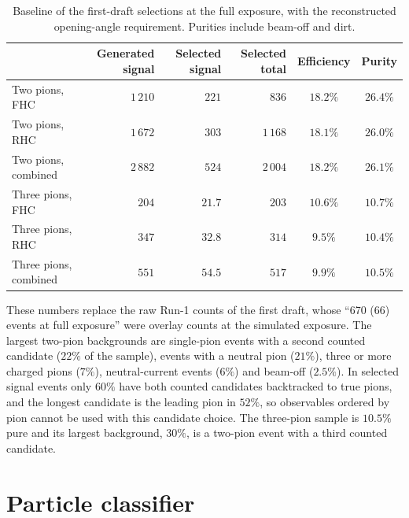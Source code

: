 \documentclass[11pt,a4paper]{article}
\begin{document}
\begin{table}[H]
  \centering
  \caption{Baseline of the first-draft selections at the full exposure, with the reconstructed
    opening-angle requirement. Purities include beam-off and dirt.}
  \label{tab:baseline}
  \small
  \begin{tabular}{lrrrcc}
    \toprule
    & Generated signal & Selected signal & Selected total & Efficiency & Purity \\
    \midrule
    Two pions, FHC       & $1\,210$ & $221$ & $836$     & $18.2\%$ & $26.4\%$ \\
    Two pions, RHC       & $1\,672$ & $303$ & $1\,168$  & $18.1\%$ & $26.0\%$ \\
    Two pions, combined  & $2\,882$ & $524$ & $2\,004$  & $18.2\%$ & $26.1\%$ \\
    \midrule
    Three pions, FHC      & $204$ & $21.7$ & $203$ & $10.6\%$ & $10.7\%$ \\
    Three pions, RHC      & $347$ & $32.8$ & $314$ & $9.5\%$  & $10.4\%$ \\
    Three pions, combined & $551$ & $54.5$ & $517$ & $9.9\%$  & $10.5\%$ \\
    \bottomrule
  \end{tabular}
\end{table}

These numbers replace the raw Run-1 counts of the first draft, whose ``670 (66) events at full
exposure'' were overlay counts at the simulated exposure. The largest two-pion backgrounds are
single-pion events with a second counted candidate ($22\%$ of the sample), events with a neutral pion
($21\%$), three or more charged pions ($7\%$), neutral-current events ($6\%$) and beam-off ($2.5\%$).
In selected signal events only $60\%$ have both counted candidates backtracked to true pions, and the
longest candidate is the leading pion in $52\%$, so observables ordered by pion cannot be used with
this candidate choice. The three-pion sample is $10.5\%$ pure and its largest background, $30\%$, is a
two-pion event with a third counted candidate.

\section{Particle classifier}
\label{sec:pid}
\end{document}
